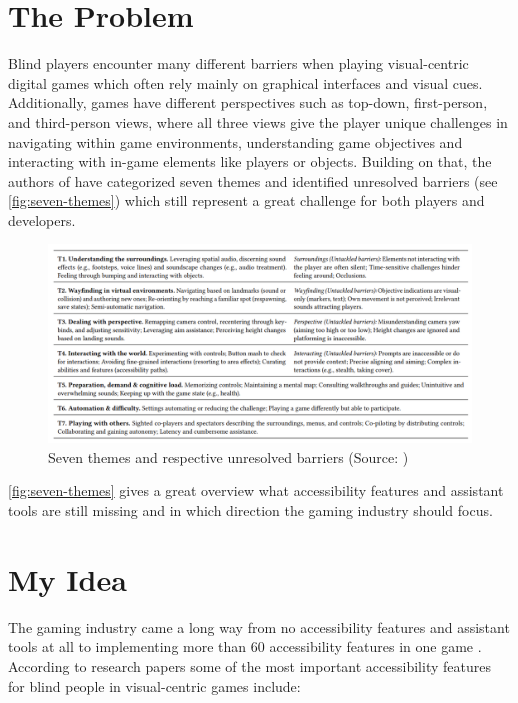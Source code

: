 \documentclass[sigconf,natbib=false,10pt]{acmart}
\begin{document}
	\section{The Problem} \label{sec:theProblem}
	Blind players encounter many different barriers when playing visual-centric digital games which often rely mainly on graphical interfaces and visual cues. 
	Additionally, games have different perspectives such as top-down, first-person, and third-person views, where all three views give the player unique challenges in navigating within game environments, understanding game objectives and interacting with in-game elements like players or objects.
	Building on that, the authors of \textcite{goncalves_my_2023} have categorized seven themes and identified unresolved barriers (see \autoref{fig:seven-themes}) which still represent a great challenge for both players and developers.
	
	\begin{figure}[ht]
		\centering
		\includegraphics[scale=0.6,width=\textwidth]{assets/seven-themes.png}
		\caption{Seven themes and respective unresolved barriers (Source: \textcite{goncalves_my_2023})}
		\label{fig:seven-themes}
	\end{figure}

	\autoref{fig:seven-themes} gives a great overview what accessibility features and assistant tools are still missing and in which direction the gaming industry should focus.
	
	\section{My Idea} \label{sec:myIdea}
	The gaming industry came a long way from no accessibility features and assistant tools at all to implementing more than 60 accessibility features in one game \cite{playstation_last_2020}.
	According to research papers \cite{goncalves_my_2023, grammenos_designing_2009, grammenos_game_2008, araujo_mobile_2017} some of the most important accessibility features for blind people in visual-centric games include:
	
\end{document}
